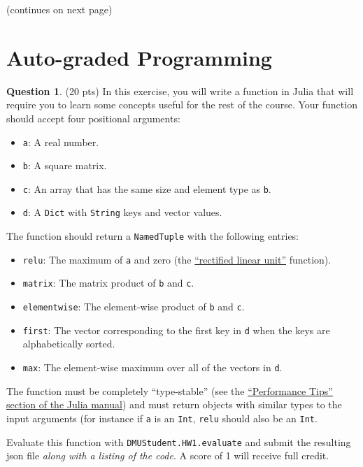 \documentclass{article}
\theoremstyle{definition}
\newtheorem{question}[thm]{Question}
\begin{document}
(continues on next page)

\pagebreak

\section{Auto-graded Programming}

\begin{question} (20 pts)
    In this exercise, you will write a function in Julia that will require you to learn some concepts useful for the rest of the course. Your function should accept four positional arguments:
    \begin{itemize}[nosep]
        \item \texttt{a}: A real number.
        \item \texttt{b}: A square matrix.
        \item \texttt{c}: An array that has the same size and element type as \texttt{b}.
        \item \texttt{d}: A \texttt{Dict} with \texttt{String} keys and vector values.
    \end{itemize}
    The function should return a \texttt{NamedTuple} with the following entries:
    \begin{itemize}[nosep]
        \item \texttt{relu}: The maximum of \texttt{a} and zero (the \href{https://en.wikipedia.org/wiki/Rectifier_(neural_networks)}{``rectified linear unit''} function).
        \item \texttt{matrix}: The matrix product of \texttt{b} and \texttt{c}.
        \item \texttt{elementwise}: The element-wise product of \texttt{b} and \texttt{c}.
        \item \texttt{first}: The vector corresponding to the first key in \texttt{d} when the keys are alphabetically sorted.
        \item \texttt{max}: The element-wise maximum over all of the vectors in \texttt{d}.
    \end{itemize}

    The function must be completely ``type-stable'' (see the \href{https://docs.julialang.org/en/v1/manual/performance-tips/#Write-%22type-stable%22-functions}{``Performance Tips'' section of the Julia manual}) and must return objects with similar types to the input arguments (for instance if \texttt{a} is an \texttt{Int}, \texttt{relu} should also be an \texttt{Int}.

    Evaluate this function with \texttt{DMUStudent.HW1.evaluate} and submit the resulting json file \textit{along with a listing of the code}. A score of 1 will receive full credit.
\end{question}
\end{document}
